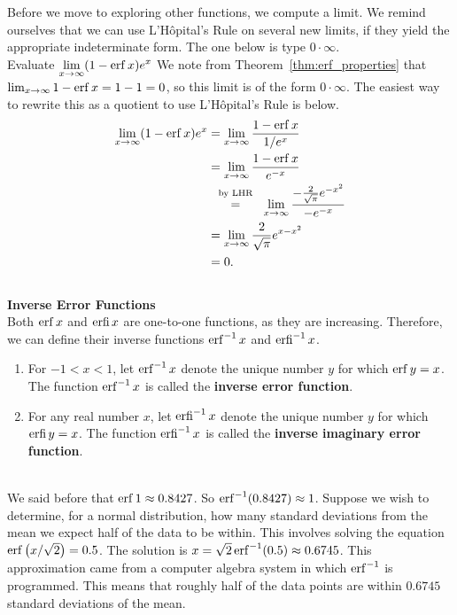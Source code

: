 Before we move to exploring other functions, we compute a limit.  We remind ourselves that we can use L'H\^{o}pital's Rule on several new limits, if they yield the appropriate indeterminate form.  The one below is type $0\cdot\infty$.\\

{Evaluate $\displaystyle \lim_{x\to \infty} (1-\operatorname{erf} x) e^x$}
{We note from Theorem~\ref{thm:erf_properties} that $\lim_{x\to\infty} 1-\operatorname{erf} x = 1-1 =0$, so this limit is of the form $0\cdot \infty$.  The easiest way to rewrite this as a quotient to use L'H\^{o}pital's Rule is below.
\begin{align*}
\lim_{x\to \infty} (1-\erf x) e^x &=
\lim_{x\to \infty} \frac{1-\erf x}{1/e^x} \\&=
\lim_{x\to \infty} \frac{1-\erf x}{e^{-x}} \\&
\stackrel{\ \text{ by LHR \rule[-5pt]{0pt}{3pt}} \ }{=}
\lim_{x\to \infty} \frac{-\frac{2}{\sqrt{\pi}}e^{-x^2}}{-e^{-x}}\\&=
\lim_{x\to \infty} \frac{2}{\sqrt{\pi}} e^{x-x^2}\\&=0.
\end{align*}
}\\


\noindent\textbf{\large Inverse Error Functions}\\

Both $\operatorname{erf} x$ and $\operatorname{erfi} x$ are one-to-one functions, as they are increasing.  Therefore, we can define their inverse functions $\operatorname{erf}^{-1} x$ and $\operatorname{erfi}^{-1} x$.\\

{\begin{enumerate}
\item For $-1<x<1$, let $\operatorname{erf}^{-1} x$ denote the unique number $y$ for which $\operatorname{erf} y = x$.  The function $\operatorname{erf}^{-1} x$ is called the \textbf{inverse error function}.
\item For any real number $x$, let $\operatorname{erfi}^{-1} x$ denote the unique number $y$ for which $\operatorname{erfi} y = x$.  The function $\operatorname{erfi}^{-1} x$ is called the \textbf{inverse imaginary error function}.
\end{enumerate}
}\\

We said before that $\operatorname{erf} 1 \approx 0.8427$.  So $\operatorname{erf}^{-1}(0.8427) \approx 1$.  Suppose we wish to determine, for a normal distribution, how many standard deviations from the mean we expect half of the data to be within.  This involves solving the equation $\operatorname{erf}\left(x/\sqrt{2}\right) = 0.5$.  The solution is $x=\sqrt{2}\operatorname{erf}^{-1}(0.5)\approx 0.6745$.  This approximation came from a computer algebra system in which $\operatorname{erf}^{-1}$ is programmed.  This means that roughly half of the data points are within $0.6745$ standard deviations of the mean.

